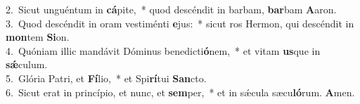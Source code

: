 {2.~}Sicut unguéntum in \textbf{cá}pite,~* quod descéndit in barbam, \textbf{bar}bam \textbf{A}aron.\\
{3.~}Quod descéndit in oram vestiménti \textbf{e}jus:~* sicut ros Hermon, qui descéndit in \textbf{mon}tem \textbf{Si}on.\\
{4.~}Quóniam illic mandávit Dóminus benedicti\textbf{ó}nem,~* et vitam \textbf{us}que in \textbf{sǽ}culum.\\
{5.~}Glória Patri, et \textbf{Fí}lio,~* et Spi\textbf{rí}tui \textbf{San}cto.\\
{6.~}Sicut erat in princípio, et nunc, et \textbf{sem}per,~* et in sǽcula sæcu\textbf{ló}rum. \textbf{A}men.\\
